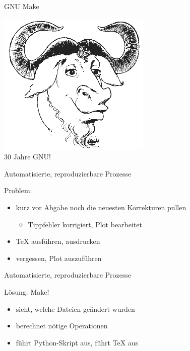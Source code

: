 
\begin{frame}{GNU Make}
  \begin{center}
    \includegraphics[scale=0.5]{logos/gnu.png} \\
    \Huge 30 Jahre GNU!
  \end{center}
\end{frame}

\begin{frame}{Automatisierte, reproduzierbare Prozesse}

  {\huge Problem:}
  \vspace{1em}
  \begin{itemize}
    \item kurz vor Abgabe noch die neuesten Korrekturen pullen
      \begin{itemize}
        \item Tippfehler korrigiert, Plot bearbeitet
      \end{itemize}
    \item \TeX{} ausführen, ausdrucken
    \item vergessen, Plot auszuführen
  \end{itemize}
\end{frame}

\begin{frame}{Automatisierte, reproduzierbare Prozesse}

  {\huge Lösung: Make!}
  \vspace{1em}
  \begin{itemize}
    \item sieht, welche Dateien geändert wurden
    \item berechnet nötige Operationen
    \item führt Python-Skript aus, führt \TeX{} aus
  \end{itemize}
\end{frame}


